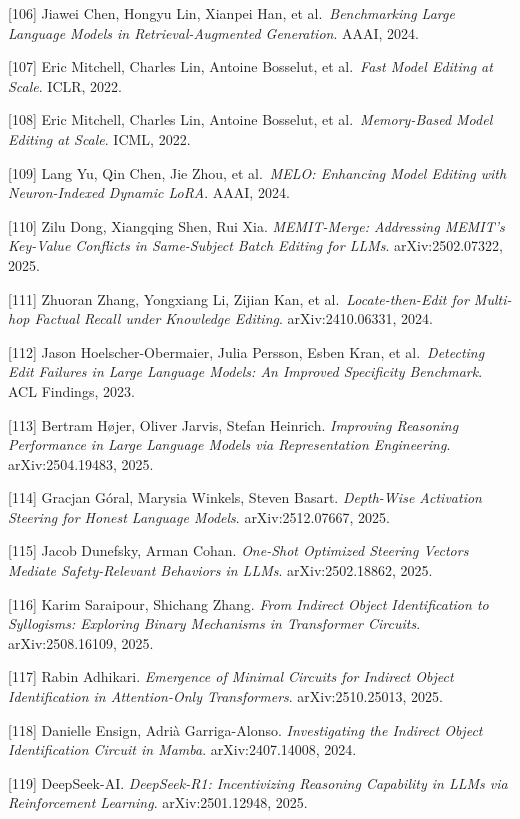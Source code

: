 {[}106{]} Jiawei Chen, Hongyu Lin, Xianpei Han, et al.~\emph{Benchmarking Large Language Models in Retrieval-Augmented Generation}. AAAI, 2024.

{[}107{]} Eric Mitchell, Charles Lin, Antoine Bosselut, et al.~\emph{Fast Model Editing at Scale}. ICLR, 2022.

{[}108{]} Eric Mitchell, Charles Lin, Antoine Bosselut, et al.~\emph{Memory-Based Model Editing at Scale}. ICML, 2022.

{[}109{]} Lang Yu, Qin Chen, Jie Zhou, et al.~\emph{MELO: Enhancing Model Editing with Neuron-Indexed Dynamic LoRA}. AAAI, 2024.

{[}110{]} Zilu Dong, Xiangqing Shen, Rui Xia. \emph{MEMIT-Merge: Addressing MEMIT's Key-Value Conflicts in Same-Subject Batch Editing for LLMs}. arXiv:2502.07322, 2025.

{[}111{]} Zhuoran Zhang, Yongxiang Li, Zijian Kan, et al.~\emph{Locate-then-Edit for Multi-hop Factual Recall under Knowledge Editing}. arXiv:2410.06331, 2024.

{[}112{]} Jason Hoelscher-Obermaier, Julia Persson, Esben Kran, et al.~\emph{Detecting Edit Failures in Large Language Models: An Improved Specificity Benchmark}. ACL Findings, 2023.

{[}113{]} Bertram Højer, Oliver Jarvis, Stefan Heinrich. \emph{Improving Reasoning Performance in Large Language Models via Representation Engineering}. arXiv:2504.19483, 2025.

{[}114{]} Gracjan Góral, Marysia Winkels, Steven Basart. \emph{Depth-Wise Activation Steering for Honest Language Models}. arXiv:2512.07667, 2025.

{[}115{]} Jacob Dunefsky, Arman Cohan. \emph{One-Shot Optimized Steering Vectors Mediate Safety-Relevant Behaviors in LLMs}. arXiv:2502.18862, 2025.

{[}116{]} Karim Saraipour, Shichang Zhang. \emph{From Indirect Object Identification to Syllogisms: Exploring Binary Mechanisms in Transformer Circuits}. arXiv:2508.16109, 2025.

{[}117{]} Rabin Adhikari. \emph{Emergence of Minimal Circuits for Indirect Object Identification in Attention-Only Transformers}. arXiv:2510.25013, 2025.

{[}118{]} Danielle Ensign, Adrià Garriga-Alonso. \emph{Investigating the Indirect Object Identification Circuit in Mamba}. arXiv:2407.14008, 2024.

{[}119{]} DeepSeek-AI. \emph{DeepSeek-R1: Incentivizing Reasoning Capability in LLMs via Reinforcement Learning}. arXiv:2501.12948, 2025.

